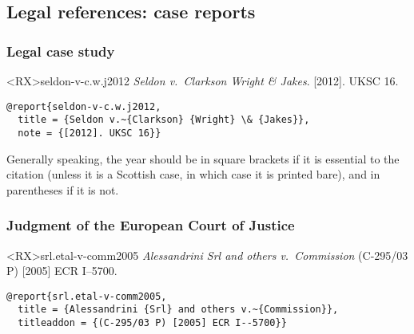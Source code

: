 \documentclass[10pt,a4paper]{article}
\newenvironment{info}{%
  \begin{list}{\makebox[2em][c]{\faInfoCircle}}{%
    \setlength{\leftmargin}{2em}
    \setlength{\labelwidth}{2em}
    \setlength{\labelsep}{0pt}}
}{\end{list}}
\begin{document}
\subsection{Legal references: case reports}

\subsubsection*{Legal case study}

\begin{bibexbox}<RX>{seldon-v-c.w.j2012}
  \emph{Seldon v.~Clarkson Wright \& Jakes}. [2012]. UKSC 16.
  \tcblower
\begin{Verbatim}
@report{seldon-v-c.w.j2012,
  title = {Seldon v.~{Clarkson} {Wright} \& {Jakes}},
  note = {[2012]. UKSC 16}}
\end{Verbatim}
\end{bibexbox}

\begin{info}\item
Generally speaking, the year should be in square brackets if it is essential to the citation
(unless it is a Scottish case, in which case it is printed bare), and in parentheses if it is
not.
\end{info}

\subsubsection*{Judgment of the European Court of Justice}

\begin{bibexbox}<RX>{srl.etal-v-comm2005}
  \emph{Alessandrini Srl and others v.~Commission} (C-295/03 P) [2005] ECR I--5700.
  \tcblower
\begin{Verbatim}
@report{srl.etal-v-comm2005,
  title = {Alessandrini {Srl} and others v.~{Commission}},
  titleaddon = {(C-295/03 P) [2005] ECR I--5700}}
\end{Verbatim}
\end{bibexbox}



\end{document}
